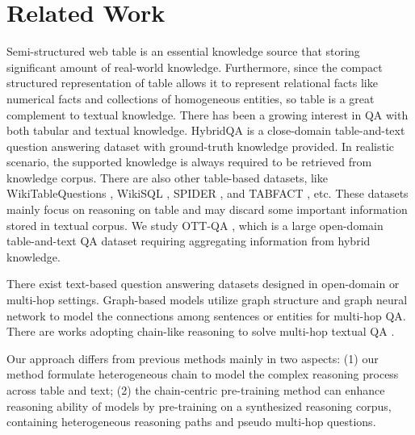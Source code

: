 \documentclass[11pt]{article}
\begin{document}
	\section{Related Work}
	Semi-structured web table is an essential knowledge source that storing
 significant amount of real-world knowledge. 
	Furthermore, since the compact structured representation of table allows it to represent relational facts like numerical facts and collections of homogeneous entities, so table is a great complement to textual knowledge. 
	There has been a growing interest in QA with both tabular and textual knowledge. 
	HybridQA \cite{chen2020hybridqa} is a close-domain table-and-text question answering dataset with ground-truth knowledge provided. 
	In realistic scenario, the supported knowledge is always required to be retrieved from knowledge corpus. 
	There are also other table-based datasets, like WikiTableQuestions \cite{wikitablequestion}, WikiSQL \cite{wikisql}, SPIDER \cite{spider}, and TABFACT \cite{chen2019tabfact}, etc.
	These datasets mainly focus on reasoning on table and may discard some important information stored in textual corpus. 
	We study OTT-QA \cite{chen2020open}, which is a large open-domain table-and-text QA dataset requiring aggregating information from hybrid knowledge. 

	There exist text-based question answering datasets designed in open-domain \cite{joshi2017triviaqa,dunn2017searchqa,nqopen} or multi-hop \cite{yang2018hotpotqa,wikihop} settings.
	Graph-based models \cite{de2018question,fang2019hierarchical, ding2019cognitive} utilize graph structure and graph neural network to model the connections among sentences or entities for multi-hop QA. 
	There are works adopting chain-like reasoning to solve multi-hop textual QA \cite{chen2019multi, asai2019learning, feng2020recoverpath}.


	Our approach differs from previous methods mainly in two aspects: 
	(1) our method formulate heterogeneous chain to model the complex reasoning process across table and text; 
	(2) the chain-centric pre-training method can enhance reasoning ability of models by pre-training on a synthesized reasoning corpus, containing heterogeneous reasoning paths and pseudo multi-hop questions. 


	
\end{document}
